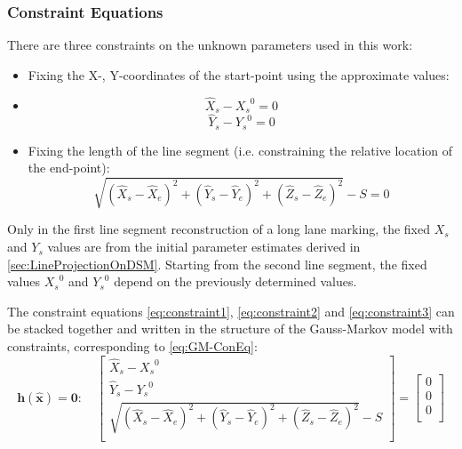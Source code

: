\subsubsection{Constraint Equations}
\label{subsubsec:ConEqua}


There are three constraints on the unknown parameters used in this work:
\begin{itemize}
\item Fixing the X-, Y-coordinates of the start-point using the approximate values:
\item [] \begin{equation} \label{eq:constraint1}
\hat{X}_s-{X_s}^0=0
\end{equation}
\begin{equation} \label{eq:constraint2}
\hat{Y}_s-{Y_s}^0=0
\end{equation}
\item Fixing the length of the line segment (i.e. constraining the relative location of the end-point):
\begin{equation} \label{eq:constraint3}
\sqrt{(\hat{X}_s-\hat{X}_e)^2+(\hat{Y}_s-\hat{Y}_e)^2+(\hat{Z}_s-\hat{Z}_e)^2}-S=0
\end{equation}
\end{itemize}

Only in the first line segment reconstruction of a long lane marking, the fixed $X_s$ and $Y_s$ values are from the initial parameter estimates derived in \cref{sec:LineProjectionOnDSM}. Starting from the second line segment, the fixed values ${X_s}^0$ and ${Y_s}^0$ depend on the previously determined values.

The constraint equations \eqref{eq:constraint1}, \eqref{eq:constraint2} and \eqref{eq:constraint3} can be stacked together and written in the structure of the Gauss-Markov model with constraints, corresponding to \cref{eq:GM-ConEq}:
\begin{equation} \label{eq:convec}
\boldsymbol h(\widehat{\boldsymbol x})=\mathbf{0}:\quad
\begin{bmatrix}
 \hat{X}_s-{X_s}^0\\[0.3em]
 \hat{Y}_s-{Y_s}^0\\[0.3em]
 \sqrt{(\hat{X}_s-\hat{X}_e)^2+(\hat{Y}_s-\hat{Y}_e)^2+(\hat{Z}_s-\hat{Z}_e)^2}-S\\[0.3em]
\end{bmatrix}
=
\begin{bmatrix}
 0\\[0.3em]
 0\\[0.3em]
 0\\[0.5em]
\end{bmatrix}
\end{equation}


